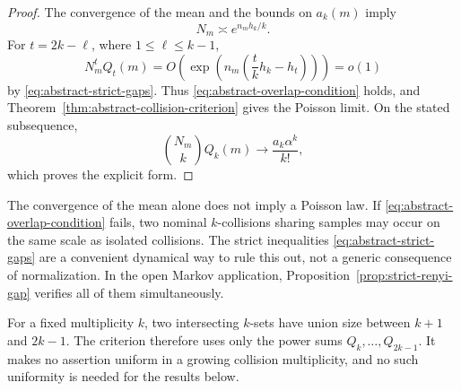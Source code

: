 \begin{proof}
The convergence of the mean and the bounds on \(a_k(m)\) imply
\[
  N_m\asymp e^{n_mh_k/k}.
\]
For \(t=2k-\ell\), where \(1\leq\ell\leq k-1\),
\[
  N_m^tQ_t(m)
  =O\!\left(
    \exp\left(n_m\left(\frac{t}{k}h_k-h_t\right)\right)
  \right)=o(1)
\]
by \eqref{eq:abstract-strict-gaps}.  Thus
\eqref{eq:abstract-overlap-condition} holds, and
Theorem~\ref{thm:abstract-collision-criterion} gives the Poisson limit.
On the stated subsequence,
\[
  \binom{N_m}{k}Q_k(m)
  \longrightarrow\frac{a_k\alpha^k}{k!},
\]
which proves the explicit form.
\end{proof}

\begin{remark}
The convergence of the mean alone does not imply a Poisson law.  If
\eqref{eq:abstract-overlap-condition} fails, two nominal
\(k\)-collisions sharing samples may occur on the same scale as isolated
collisions.  The strict inequalities
\eqref{eq:abstract-strict-gaps} are a convenient dynamical way to rule
this out, not a generic consequence of normalization.  In the open
Markov application, Proposition~\ref{prop:strict-renyi-gap} verifies all
of them simultaneously.
\end{remark}

\begin{remark}
For a fixed multiplicity \(k\), two intersecting \(k\)-sets have union
size between \(k+1\) and \(2k-1\).  The criterion therefore uses only
the power sums \(Q_k,\ldots,Q_{2k-1}\).  It makes no assertion uniform
in a growing collision multiplicity, and no such uniformity is needed
for the results below.
\end{remark}
